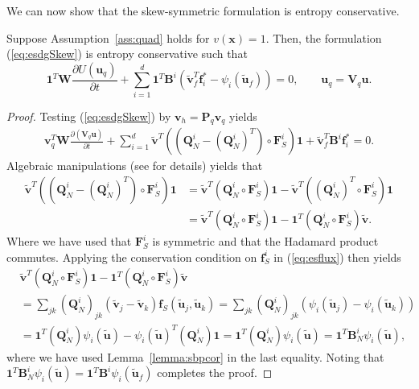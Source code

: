 \documentclass{svjour3}                     %
\renewcommand{\tilde}{\widetilde}
\newcommand{\pd}[2]{\frac{\partial#1}{\partial#2}}
\newcommand{\LRp}[1]{\left( #1 \right)}
\begin{document}
We can now show that the skew-symmetric formulation is entropy conservative.  
\begin{theorem}
Suppose Assumption~\ref{ass:quad} holds for $v(\bm{x}) = 1$.  
Then, the formulation (\ref{eq:esdgSkew}) is entropy conservative such that
\begin{equation}
\bm{1}^T\bm{W}\pd{U(\bm{u}_q)}{t} + \sum_{i=1}^d\bm{1}^T\bm{B}^i \LRp{\tilde{\bm{v}}_f^T\bm{f}_i^* - \psi_i(\tilde{\bm{u}}_f)} = 0, \qquad \bm{u}_q = \bm{V}_q\bm{u}.
\label{eq:esdgthm}
\end{equation}
\label{thm:esdg}
\end{theorem}
\begin{proof}
Testing (\ref{eq:esdgSkew}) by $\bm{v}_h = \bm{P}_q\bm{v}_q$ yields 
\begin{align}
\bm{v}_q^T\bm{W}\pd{\LRp{\bm{V}_q\bm{u}}}{t} + \sum_{i=1}^d
\tilde{\bm{v}}^T \LRp{\LRp{\bm{Q}^i_N - \LRp{\bm{Q}^i_N}^T} \circ \bm{F}^i_S}\bm{1} + \tilde{\bm{v}}_f^T \bm{B}^i\bm{f}_i^* = 0.
\label{eq:entropyrhs}
\end{align}
Algebraic manipulations (see \cite{chan2017discretely} for details) yields that 
\begin{align*}
\tilde{\bm{v}}^T \LRp{\LRp{\bm{Q}^i_N - \LRp{\bm{Q}^i_N}^T} \circ \bm{F}^i_S}\bm{1} &= \tilde{\bm{v}}^T \LRp{\bm{Q}^i_N \circ \bm{F}^i_S}\bm{1} - \tilde{\bm{v}}^T \LRp{\LRp{\bm{Q}^i_N}^T \circ \bm{F}^i_S}\bm{1}\\
&= \tilde{\bm{v}}^T \LRp{\bm{Q}^i_N \circ \bm{F}^i_S}\bm{1} - \bm{1}^T \LRp{{\bm{Q}^i_N} \circ \bm{F}^i_S}\tilde{\bm{v}}.
\end{align*}
Where we have used that $\bm{F}^i_S$ is symmetric and that the Hadamard product commutes.  Applying the conservation condition on $\bm{f}^i_S$ in (\ref{eq:esflux}) then yields
\begin{align*}
&\tilde{\bm{v}}^T \LRp{\bm{Q}^i_N \circ \bm{F}^i_S}\bm{1} - \bm{1}^T \LRp{{\bm{Q}^i_N} \circ \bm{F}^i_S}\tilde{\bm{v}} \\
&= \sum_{jk} \LRp{\bm{Q}^i_N}_{jk} \LRp{\tilde{\bm{v}}_j-\tilde{\bm{v}}_k} \bm{f}_S\LRp{\tilde{\bm{u}}_j,\tilde{\bm{u}}_k} = \sum_{jk} \LRp{\bm{Q}^i_N}_{jk} \LRp{\psi_i(\tilde{\bm{u}}_j) - \psi_i(\tilde{\bm{u}}_k)}\\
&= \bm{1}^T\LRp{\bm{Q}^i_N}\psi_i(\tilde{\bm{u}}) - \psi_i(\tilde{\bm{u}})^T\LRp{\bm{Q}^i_N}\bm{1} = \bm{1}^T\LRp{\bm{Q}^i_N}\psi_i(\tilde{\bm{u}}) = \bm{1}^T\bm{B}^i_N\psi_i(\tilde{\bm{u}}),
\end{align*}
where we have used Lemma~\ref{lemma:sbpcor} in the last equality.  Noting that $\bm{1}^T\bm{B}^i_N\psi_i(\tilde{\bm{u}}) = \bm{1}^T\bm{B}^i \psi_i(\tilde{\bm{u}}_f)$ completes the proof.
\end{proof}
\end{document}
